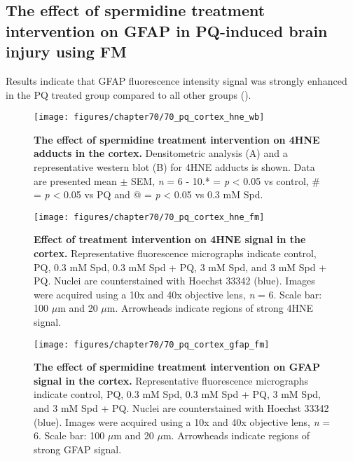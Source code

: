 \subsection{The effect of spermidine treatment intervention on GFAP in PQ-induced brain injury using FM}
Results indicate that GFAP fluorescence intensity signal was strongly enhanced in the PQ treated group compared to all other groups ().

\begin{landscape}
\begin{figure}[!htbp]
\center
  \texttt{[image: figures/chapter70/70\_pq\_cortex\_hne\_wb]}
  \caption[The effect of spermidine treatment intervention on 4HNE adducts in the cortex]{\textbf{The effect of spermidine treatment intervention on 4HNE adducts in the cortex.} Densitometric analysis (A) and a representative western blot (B) for 4HNE adducts is shown. Data are presented  mean $\pm$ SEM, \textit{n} = 6 - 10.* = \textit{p} < 0.05 vs control, \# = \textit{p} < 0.05 vs PQ and @ = \textit{p} < 0.05 vs 0.3 mM Spd.}
  \label{fig:70_pq_cortex_hne_wb}
\end{figure} 
\end{landscape}

\begin{landscape}
\begin{figure}[!htbp]
\center
  \texttt{[image: figures/chapter70/70\_pq\_cortex\_hne\_fm]}
  \caption[Effect of treatment intervention on 4HNE signal in the cortex]{\textbf{Effect of treatment intervention on 4HNE signal in the cortex.} Representative fluorescence micrographs indicate control, PQ, 0.3 mM Spd, 0.3 mM Spd + PQ, 3 mM Spd, and 3 mM Spd + PQ. Nuclei are counterstained with Hoechst 33342 (blue). Images were acquired using a 10x and 40x objective lens, \textit{n} = 6. Scale bar: 100 $\mu$m and 20 $\mu$m. Arrowheads indicate regions of strong 4HNE signal.}
  \label{fig:70_pq_cortex_hne_fm}
\end{figure} 
\end{landscape}

\begin{landscape}
\begin{figure}[!htbp]
\center
  \texttt{[image: figures/chapter70/70\_pq\_cortex\_gfap\_fm]}
  \caption[The effect of spermidine treatment intervention on GFAP signal in the cortex]{\textbf{The effect of spermidine treatment intervention on GFAP signal in the cortex.} Representative fluorescence micrographs indicate control, PQ, 0.3 mM Spd, 0.3 mM Spd + PQ, 3 mM Spd, and 3 mM Spd + PQ. Nuclei are counterstained with Hoechst 33342 (blue). Images were acquired using a 10x and 40x objective lens, \textit{n} = 6. Scale bar: 100 $\mu$m and 20 $\mu$m. Arrowheads indicate regions of strong GFAP signal.}
  \label{fig:70_pq_cortex_gfap_fm}
\end{figure} 
\end{landscape}

